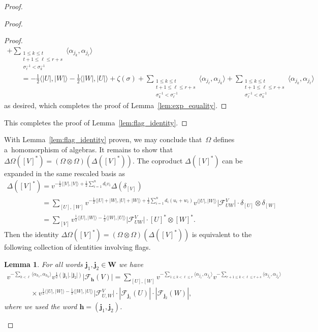 \documentclass[pdftex]{sigma}
\numberwithin{equation}{section}
\newtheorem{Lemma}[Theorem]{Lemma}
\begin{document}
\begin{proof}
\begin{proof}
\begin{proof}
\begin{gather*}
+\sum\limits_{\substack{1\le k\le t\\t+1\le\ell\le r+s\\ \sigma_\ell^{-1}<\sigma_k^{-1}}}\langle\alpha_{j_k},\alpha_{j_\ell}\rangle
\\
\qquad
=-\frac{1}{2}\langle |U|,|W|\rangle-\frac{1}{2}\langle |W|,|U|\rangle+\zeta(\sigma)
+\sum\limits_{\substack{1\le k\le t\\t+1\le\ell\le r+s\\ \sigma_k^{-1}<\sigma_\ell^{-1}}}\langle\alpha_{j_\ell},\alpha_{j_k}\rangle
+\sum\limits_{\substack{1\le k\le t\\t+1\le\ell\le r+s\\ \sigma_\ell^{-1}<\sigma_k^{-1}}}\langle\alpha_{j_k},\alpha_{j_\ell}\rangle
\end{gather*}
as desired, which completes the proof of Lemma~\ref{lem:exp_equality}.
\end{proof}

This completes the proof of Lemma~\ref{lem:flag_identity}.
\end{proof}

With Lemma~\ref{lem:flag_identity} proven, we may conclude that~$\Omega$ def\/ines a~homomorphism of algebras.
It remains to show that $\Delta\Omega([V]^*)=(\Omega\otimes\Omega)(\Delta([V]^*))$.
The coproduct $\Delta([V]^*)$ can be expanded in the same rescaled basis as
\begin{gather*}
\Delta([V]^*)=v^{-\frac{1}{2}\langle |V|,|V|\rangle+\frac{1}{2}\sum\limits_{i=1}^n d_iv_i}\Delta(\delta_{[V]})
\\
\phantom{\Delta([V]^*)}
 =\sum\limits_{[U],[W]}v^{-\frac{1}{2}\langle |U|+|W|,|U|+|W|\rangle+\frac{1}{2}\sum\limits_{i=1}^n
d_i(u_i+w_i)}v^{\langle|U|,|W|\rangle}\big|\mathcal{F}^V_{UW}\big|\cdot \delta_{[U]}\otimes\delta_{[W]}
\\
\phantom{\Delta([V]^*)}
 =\sum\limits_{[V]}v^{\frac{1}{2}\langle |U|,|W|\rangle-\frac{1}{2}\langle |W|,|U|\rangle} \big|\mathcal{F}^V_{UW}\big|\cdot
[U]^*\otimes[W]^*.
\end{gather*}
Then the identity $\Delta\Omega([V]^*)=(\Omega\otimes\Omega)(\Delta([V]^*))$ is equivalent to the following collection
of identities involving f\/lags.
\begin{Lemma}
For all words $\mathbf{j}_1,\mathbf{j}_2\in\mathbf{W}$ we have
\begin{gather*}
 v^{-\sum\limits_{k<\ell}\langle
\alpha_{h_\ell},\alpha_{h_k}\rangle}v^{\frac{1}{2}(|\mathbf{j}_1|,|\mathbf{j}_2|)}|\mathcal{F}_\mathbf{h}(V)|
 =\sum\limits_{[U],[W]}v^{-\sum\limits_{1\le k<\ell\le r}\langle\alpha_{j_\ell},\alpha_{j_k}\rangle}
v^{-\sum\limits_{r+1\le k<\ell\le r+s}\langle\alpha_{j_\ell},\alpha_{j_k}\rangle}
\\
\qquad
\phantom{=}{}
\times
v^{\frac{1}{2}\langle|U|,|W|\rangle-\frac{1}{2}\langle|W|,|U|\rangle}
\big|\mathcal{F}_{U,W}^V\big|\cdot|\mathcal{F}_{\mathbf{j}_1}(U)|\cdot|\mathcal{F}_{\mathbf{j}_2}(W)|,
\end{gather*}
where we used the word $\mathbf{h}=(\mathbf{j}_1,\mathbf{j}_2)$.
\end{Lemma}


\end{proof}
\end{document}
